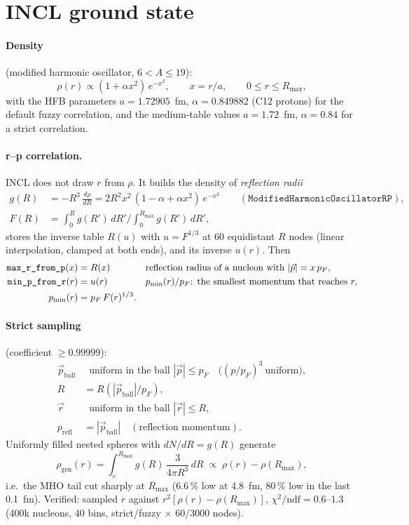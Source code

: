 \documentclass[11pt]{article}
\newcommand{\vv}[1]{\vec{#1}}
\newcommand{\ball}{\mathrm{ball}}
\newcommand{\refl}{\mathrm{refl}}
\newcommand{\Rmax}{R_{\max}}
\newcommand{\pF}{p_F}
\newcommand{\code}[1]{\texttt{#1}}
\newcommand{\codem}[1]{\text{\texttt{#1}}}
\begin{document}
\section{INCL ground state}

\paragraph{Density} (modified harmonic oscillator, $6<A\le 19$):
\begin{equation*}
\rho(r)\propto(1+\alpha x^2)\,e^{-x^2},\qquad x=r/a,\qquad 0\le r\le\Rmax,
\end{equation*}
with the HFB parameters $a=1.72905$~fm, $\alpha=0.849882$ (C12 protons) for the
default fuzzy correlation, and the medium-table values $a=1.72$~fm, $\alpha=0.84$
for a strict correlation.

\paragraph{r--p correlation.} INCL does not draw $r$ from $\rho$. It builds the
density of \emph{reflection radii}
\begin{align*}
g(R) &= -R^3\,\frac{d\rho}{dR} = 2R^2x^2\,(1-\alpha+\alpha x^2)\,e^{-x^2}
\qquad(\code{ModifiedHarmonicOscillatorRP}),\\
F(R) &= \int_0^R g(R')\,dR' \Big/ \int_0^{\Rmax} g(R')\,dR',
\end{align*}
stores the inverse table $R(u)$ with $u=F^{1/3}$ at 60 equidistant $R$ nodes
(linear interpolation, clamped at both ends), and its inverse $u(r)$. Then
\begin{align*}
\codem{max\_r\_from\_p}(x) &= R(x) &&\text{reflection radius of a nucleon with } |\vv p|=x\,\pF,\\
\codem{min\_p\_from\_r}(r) &= u(r) &&p_{\min}(r)/\pF\text{: the smallest momentum that reaches } r,\\
p_{\min}(r) &= \pF\,F(r)^{1/3}.
\end{align*}

\paragraph{Strict sampling} (coefficient $\ge 0.99999$):
\begin{align*}
\vv p_\ball &\ \text{ uniform in the ball } |\vv p|\le\pF \quad\big((p/\pF)^3\ \text{uniform}\big),\\
R &= R(|\vv p_\ball|/\pF),\\
\vv r &\ \text{ uniform in the ball } |\vv r|\le R,\\
p_\refl &= |\vv p_\ball| \quad(\text{reflection momentum}).
\end{align*}
Uniformly filled nested spheres with $dN/dR=g(R)$ generate
\begin{equation*}
\rho_{\mathrm{gen}}(r)=\int_r^{\Rmax} g(R)\,\frac{3}{4\pi R^3}\,dR
\;\propto\; \rho(r)-\rho(\Rmax),
\end{equation*}
i.e.\ the MHO tail cut sharply at $\Rmax$ (6.6\,\% low at 4.8~fm, 80\,\% low in the
last 0.1~fm). Verified: sampled $r$ against $r^2[\rho(r)-\rho(\Rmax)]$,
$\chi^2/\mathrm{ndf}=0.6$--$1.3$ (400k nucleons, 40 bins, strict/fuzzy $\times$
60/3000 nodes).
\end{document}
